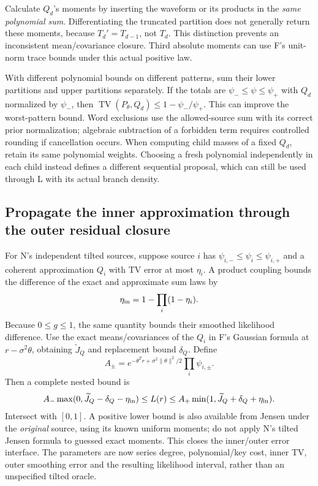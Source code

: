 \documentclass[10pt,a4paper]{article}
\newcommand{\TV}{\operatorname{TV}}
\begin{document}
Calculate $Q_d$'s moments by inserting the waveform or its products in the \emph{same polynomial sum}.
Differentiating the truncated partition does not generally return these moments, because
$T_d'=T_{d-1}$, not $T_d$. This distinction prevents an inconsistent mean/covariance closure.
Third absolute moments can use F's unit-norm trace bounds under this actual positive law.

With different polynomial bounds on different patterns, sum their lower partitions and upper partitions
separately. If the totals are $\psi_-\leq\psi\leq\psi_+$ with $Q_d$ normalized by $\psi_-$, then
$\TV(P_\theta,Q_d)\leq1-\psi_-/\psi_+$. This can improve the worst-pattern bound.
Word exclusions use the allowed-source sum with its correct prior normalization; algebraic subtraction
of a forbidden term requires controlled rounding if cancellation occurs.
When computing child masses of a fixed $Q_d$, retain its same polynomial weights.
Choosing a fresh polynomial independently in each child instead defines a different sequential proposal,
which can still be used through L with its actual branch density.

\subsection{Propagate the inner approximation through the outer residual closure}
For N's independent tilted sources, suppose source $i$ has
$\psi_{i,-}\leq\psi_i\leq\psi_{i,+}$ and a coherent approximation $Q_i$ with TV error at most $\eta_i$.
A product coupling bounds the difference of the exact and approximate sum laws by
\[
 \eta_{\rm in}=1-\prod_i(1-\eta_i).
\]
Because $0\leq g\leq1$, the same quantity bounds their smoothed likelihood difference.
Use the exact means/covariances of the $Q_i$ in F's Gaussian formula at $r-\sigma^2\theta$, obtaining
$\widetilde J_Q$ and replacement bound $\delta_Q$. Define
\[
 A_\pm=e^{-\theta^Tr+\sigma^2\|\theta\|^2/2}\prod_i\psi_{i,\pm}.
\]
Then a complete nested bound is
\begin{equation}
 A_-\max(0,\widetilde J_Q-\delta_Q-\eta_{\rm in})
 \leq L(r)\leq
 A_+\min(1,\widetilde J_Q+\delta_Q+\eta_{\rm in}).
 \label{eq:nested-tilted-bound}
\end{equation}
Intersect with $[0,1]$. A positive lower bound is also available from Jensen under the \emph{original}
source, using its known uniform moments; do not apply N's tilted Jensen formula to guessed exact moments.
This closes the inner/outer error interface. The parameters are now series degree, polynomial/key cost,
inner TV, outer smoothing error and the resulting likelihood interval, rather than an unspecified tilted oracle.
\end{document}
